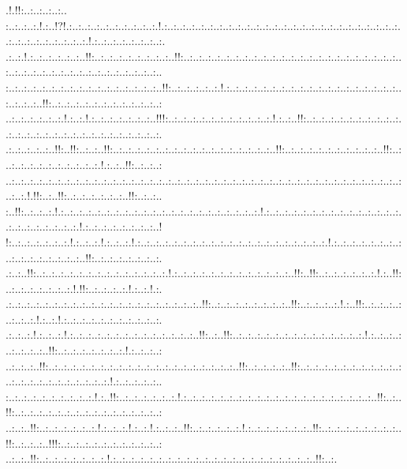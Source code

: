 \documentclass[paper=a4, fontsize=11pt]{scrartcl} %
\numberwithin{equation}{section} %
\numberwithin{figure}{section} %
\numberwithin{table}{section} %
\begin{document}
.!.!!:..:..:..:..:..\\:..:..:..:.!.:..!?!.:..:..:..:..:..:..:..:..:..:.!.:..:..:..:..:..:..:..:..:..:..:..:..:..:..:..:..:..:..:..:..:..:..:..:..:..:..:..:..:..:..:..:..:..:..:.!.:..:..:..:..:..:..:..:.\\.:..:.!.:..:..:..:..:..:..!!:..:..:..:..:..:..:..:..:..!!:..:..:..:..:..:..:..:..:..:..:..:..:..:..:..:..:..:..:..:..:..:..:..:..:..:..:..:..:..:..:..:..:..:..:..:..:..:..:..:..:..\\:..:..:..:..:..:..:..:..:..:..:..:..:..:..:..:..:..!!:..:..:..:..:..:.!.:..:..:..:..:..:..:..:..:..:..:..:..:..:..:..:..:..:..:..:..:..:..:..!!:..:..:..:..:..:..:..:..:..:..:..:..:\\..:..:..:..:..:..:.!.:..:.!.:..:..:..:..:..:..:..!!!:..:..:..:..:..:..:..:..:..:..:..:.!.:..:..!!:..:..:..:..:..:..:..:..:..:..:..:..:..:..:..:..:..:..:..:..:..:..:..:..:..:..:..:.\\.:..:..:..:..:..!!:..!!:..:..:..!!:..:..:..:..:..:..:..:..:..:..:..:..:..:..:..:..:..:..!!:..:..:..:..:..:..:..:..:..:..:..!!:..:..:..:..:..:..:..:..:..:..:..:.!.:..:..!!:..:..:..:\\..:..:..:..:..:..:..:..:..:..:..:..:..:..:..:..:..:..:..:..:..:..:..:..:..:..:..:..:..:..:..:..:..:..:..:..:..:..:..:..:..:..:..:..:..:.!.!!:..:..!!:..:..:..:..:..:..:..!!:..:..:..\\:..!!:..:..:..:.!.:..:..:..:..:..:..:..:..:..:..:..:..:..:..:..:..:..:..:..:..:..:.!.:..:..:..:..:..:..:..:..:..:..:..:..:..:..:..:..:..:..:..:..:..:..:.!.:..:..:..:..:..:..:..:..!\\!:..:..:..:..:..:..:.!.:..:..:.!.:..:..:.!.:..:..:..:..:..:..:..:..:..:..:..:..:..:..:..:..:..:..:..:..:.!.:..:..:..:..:..:..:..:..:..:..:..:..:..:..:..:..!!:..:..:..:..:..:..:..:.\\.:..:..!!:..:..:..:..:..:..:..:..:..:..:..:..:..:..:.!.:..:..:..:..:..:..:..:..:..:..:..:..:..!!:..!!:..:..:..:..:..:..:.!.:..!!:..:..:..:..:..:..:..:.!.!!:..:..:..:..:.!.:..:.!.:.\\.:..:..:..:..:..:..:..:..:..:..:..:..:..:..:..:..:..:..:..:..:..!!:..:..:..:..:..:..:..:..:..!!:..:..:..:..:.!.:..!!:..:..:..:..:..:..:..:.!.:..:.!.:..:..:..:..:..:..:..:..:..:..:.\\.:..:..:.!.:..:..:.!.:..:..:..:..:..:..:..:..:..:..:..:..:..:..!!:..:..!!:..:..:..:..:..:..:..:..:..:..:..:..:..:..:.!.:..:..:..:..:..:..:..:..!!:..:..:..:..:..:..:..:.!.:..:..:..:\\..:..:..:..!!:..:..:..:..:..:..:..:..:..:..:..:..:..:..:..:..:..:..:..:..:..!!:..:..:..:..:..!!:..:..:..:..:..:..:..:..:..:..:..:..:..:..:..:..:..:..:..:..:..:..:.!.:..:..:..:..:..\\:..:..:..:..:..:..:..:..:..:.!.:..!!:..:..:..:..:..:..:.!.:..:..:..:..:..:..:..:..:..:..:..:..:..:..:..:..:..:..:..:..:..!!:..:..!!:..:..:..:..:..:..:..:..:..:..:..:..:..:..:..:..:\\..:..:..!!:..:..:..:..:..:..:.!.:..:..:.!.:..:.!.:..:..:..!!:..:..:..:..:..:.!.:..:..:..:..:..:..:..!!:..:..:..:..:..:..:..:..:..!!:..:..:..:..!!!:..:..:..:..:..:..:..:..:..:..:..:\\..:..:..!!:..:..:..:..:..:..:..:.!.:..:..:..:..:..:..:..:..:..:..:..:..:..:..:..:..:..:..:..:..:..:..!!:..:.
\end{document}
